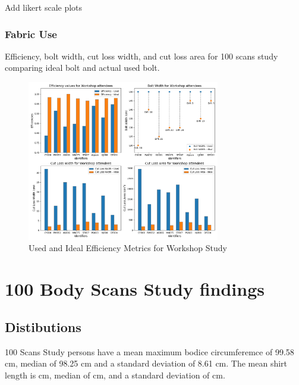 Add likert scale plots

\subsubsection{Fabric Use}
Efficiency, bolt width, cut loss width, and cut loss area for 100 scans study comparing ideal bolt and actual used bolt.
\begin{figure} [H] %
    \centering %
    \includegraphics[width = 0.75\textwidth]{Images/Workshop_Plot.png} %
    \caption{Used and Ideal Efficiency Metrics for Workshop Study}
\end{figure}



\section{100 Body Scans Study findings}
\subsection{Distibutions}
100 Scans Study persons have a mean maximum bodice circumferemce of 99.58 cm, median of 98.25 cm and a standard deviation of 8.61 cm. The mean shirt length is  cm, median of  cm, and a standard deviation of  cm.

